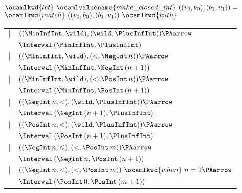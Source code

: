
        $\ocamlkwd{let} \,\, \ocamlvaluename{make\_closed\_int} \,\,
        ((v_0, b_0), (b_1, v_1)) =$\\
        \hspace*{3mm}
        $\ocamlkwd{match} \,\, ((v_0, b_0), (b_1, v_1)) \,\, \ocamlkwd{with}$ \\ 
        \begin{tabular}{rl}
           $\mid$
             & $((\MinInfInt, \wild), (\wild, \PlusInfInt)) \PAarrow$\\
             & \hspace*{3mm}
               $\Interval \, (\MinInfInt, \PlusInfInt)$\\
           $\mid$
             & $((\MinInfInt, \wild), (<, \NegInt
                \, n)) \PAarrow$\\
             & \hspace*{3mm}
               $\Interval \, (\MinInfInt, \NegInt \, (n + 1))$\\
           $\mid$
             & $((\MinInfInt, \wild), (<, \PosInt \, n)) \PAarrow$\\
             & \hspace*{3mm}
               $\Interval \, (\MinInfInt, \PosInt \, (n + 1))$\\
           $\mid$ 
             & $((\NegInt \, n, <), (\wild, \PlusInfInt)) \PAarrow$\\
             & \hspace*{3mm}
               $\Interval \, (\NegInt \, (n + 1), \PlusInfInt)$\\
           $\mid$
             & $((\PosInt \, n, <), (\wild, \PlusInfInt))
               \PAarrow$\\
             & \hspace*{3mm}
               $\Interval \, (\PosInt \, (n + 1), \PlusInfInt)$\\
           $\mid$
             & $((\NegInt \, n, \leqslant), (<, \PosInt \, m))
                \PAarrow$\\
             & \hspace*{3mm}
               $\Interval \, (\NegInt \, n, \PosInt \, (n + 1))$\\
           $\mid$
             & $((\NegInt \, n, <), (<, \PosInt \, m)) \,\,
               \ocamlkwd{when} \,\, n = 1 \PAarrow$\\
             & \hspace*{3mm}
               $\Interval \, (\PosInt \, 0, \PosInt \, (m + 1))$\\

\end{tabular}
